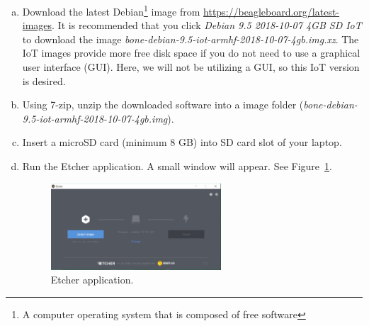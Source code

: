 \begin{enumerate}[a)]
  
\item Download the latest Debian\footnote{A computer operating system that is composed of free software} image from \url{https://beagleboard.org/latest-images}. It is recommended that you click \emph{Debian 9.5 2018-10-07 4GB SD IoT} to download the image \emph{bone-debian-9.5-iot-armhf-2018-10-07-4gb.img.xz}.   The IoT images provide more free disk space if you do not need to use a graphical user interface (GUI). Here, we will not be utilizing a GUI, so this IoT version is desired. 
\item Using 7-zip, unzip the downloaded software into a image folder (\emph{bone-debian-9.5-iot-armhf-2018-10-07-4gb.img}).

\item Insert a microSD card (minimum 8 GB) into SD card slot of your laptop. 
\item Run the Etcher application. A small window will appear. See Figure~\ref{fig:Etcher}. %
%
\begin{figure}
    \centering
    \includegraphics[width= 0.6\textwidth]{figs/img/Lab0/Etcher.png}
    \caption{Etcher application.}
    \label{fig:Etcher}
\end{figure}
%


\end{enumerate}
